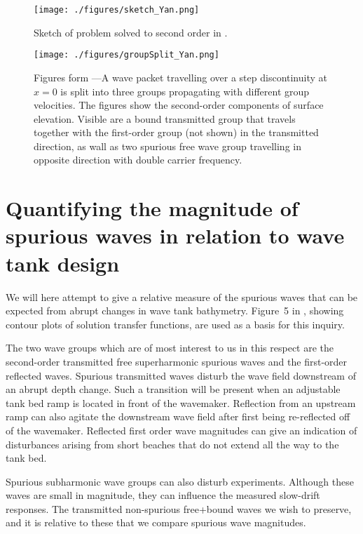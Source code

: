 \documentclass[internal]{sintefmemo}
\begin{document}
\begin{figure}[h!ptb]%
\centering
\texttt{[image: ./figures/sketch\_Yan.png]}%
\caption{Sketch of problem solved to second order in \citet{li_2021_step1}.}%
\label{fig:sketch_Yan}%
\end{figure}
 
\begin{figure}[h!tbp]%
\centering
\texttt{[image: ./figures/groupSplit\_Yan.png]}%
\caption{Figures form \citet{li_2021_step1}---A wave packet travelling over a step discontinuity at $x=0$ is split into three groups propagating with different group velocities.
The figures show the second-order components of surface elevation.
Visible are
a bound transmitted group that travels together with the first-order group (not shown) in the transmitted direction, as wall as
two spurious free wave group travelling in opposite direction with double carrier frequency. }%
\label{fig:groupSplit_Yan}%
\end{figure}






\section{Quantifying the magnitude of spurious waves in relation to wave tank design}
\label{sec:quantifying}
We will here attempt to give a relative measure of the spurious waves that can be expected from abrupt changes in wave tank bathymetry.
Figure~5 in \citet{li_2021_step1}, showing contour plots of solution transfer functions, are used as a basis for this inquiry. 

The two wave groups which are of most interest to us in this respect are the second-order transmitted free superharmonic spurious waves and the first-order reflected waves.
Spurious transmitted waves disturb the wave field downstream of an abrupt depth change. Such a transition will be present when an adjustable tank bed ramp is located in front of the wavemaker. 
Reflection from an upstream ramp can also agitate the downstream wave field after first being re-reflected off of the wavemaker. 
Reflected first order wave magnitudes can give an indication of disturbances arising from short beaches that do not extend all the way to the tank bed.

Spurious subharmonic wave groups can also disturb experiments. Although these waves are small in magnitude, they can influence the measured slow-drift responses.
The transmitted non-spurious free+bound waves we wish to preserve, and it is relative to these that we  compare spurious wave magnitudes.
\end{document}
